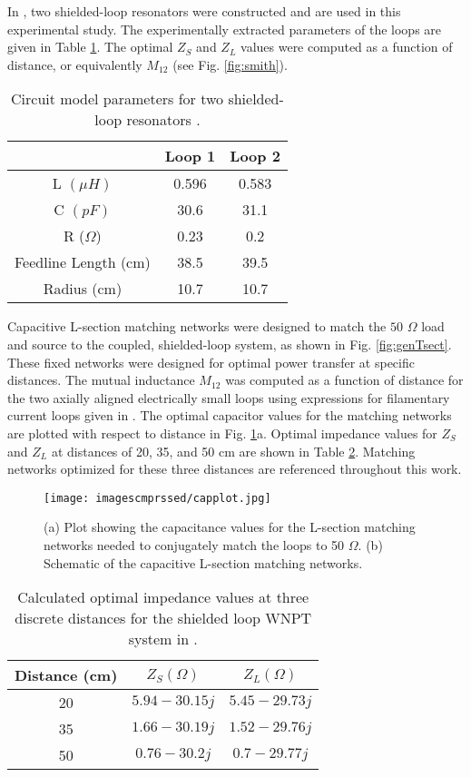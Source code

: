 \documentclass[journal]{IEEEtran}
\begin{document}
In \cite{Thomas}, two shielded-loop resonators were constructed and are used in this experimental study. The experimentally extracted parameters of the loops are given in Table \ref{table:LoopParameters}. The optimal $Z_S$ and $Z_L$ values were computed as a function of distance, or equivalently $M_{12}$ (see Fig. \ref{fig:smith}).
\begin{table}[htbp]
\centering
\begin{tabular}{|c|c|c|}
\hline
& Loop 1 & Loop 2  \\ \hline
L $(\mu H)$ & 0.596 & 0.583  \\ \hline
C $(pF)$ & 30.6 & 31.1 \\ \hline
R ($\Omega$) & 0.23 & 0.2  \\ \hline
Feedline Length (cm) & 38.5 & 39.5 \\ \hline
Radius (cm) & 10.7 & 10.7 \\ \hline
\end{tabular}
\caption{Circuit model parameters for two shielded-loop resonators \cite{Thomas}.}
\label{table:LoopParameters}
\end{table}

Capacitive L-section matching networks were designed to match the $50$ $\Omega$ load and source to the coupled, shielded-loop system, as shown in Fig. \ref{fig:genTsect}. These fixed networks were designed for optimal power transfer at specific distances. The mutual inductance $M_{12}$ was computed as a function of distance for the two axially aligned electrically small loops using expressions for filamentary current loops given in \cite{Liepa}. The optimal capacitor values for the matching networks are plotted with respect to distance in Fig. \ref{fig:capplot}a. Optimal impedance values for $Z_S$ and $Z_L$ at distances of 20, 35, and 50 cm are shown in Table \ref{table:MatchValues}. Matching networks optimized for these three distances are referenced throughout this work.

\begin{figure}[htbp]
    \centering
    \texttt{[image: imagescmprssed/capplot.jpg]}
    \caption{(a) Plot showing the capacitance values for the L-section matching networks needed to conjugately match the loops to 50 $\Omega$. (b) Schematic of the capacitive L-section matching networks.}
    \label{fig:capplot}
\end{figure}

\begin{table}[htbp]
\centering
\renewcommand{\arraystretch}{1.2}
\begin{tabular}{|c|c|c|}
\hline
Distance (cm) & $Z_S (\Omega)$ & $Z_L (\Omega)$  \\ \hline
20 & $5.94-30.15 j$ & $5.45-29.73 j$ \\ \hline
35 & $1.66-30.19 j$ & $1.52-29.76 j$ \\ \hline
50 & $0.76-30.2 j$ & $0.7-29.77 j$ \\ \hline
\end{tabular}
\caption{Calculated optimal impedance values at three discrete distances for the shielded loop WNPT system in \cite{Thomas}.}
\label{table:MatchValues}
\end{table}
\end{document}
